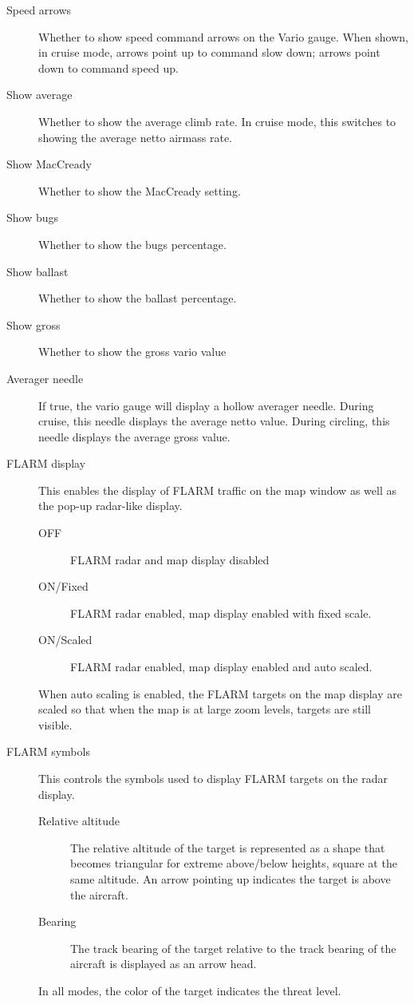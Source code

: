 \documentclass[a4paper,12pt]{refrep}
\begin{document}
\begin{description}
\item[Speed arrows] Whether to show speed command arrows on the Vario gauge.
When shown, in cruise mode, arrows point up to command slow down; arrows point down to command speed up.
\item[Show average]  Whether to show the average climb rate.  In cruise mode, this switches to showing the average netto airmass rate.
\item[Show MacCready] Whether to show the MacCready setting.
\item[Show bugs] Whether to show the bugs percentage.
\item[Show ballast] Whether to show the ballast percentage.
\item[Show gross] Whether to show the gross vario value
\item[Averager needle] If true, the vario gauge will display a hollow averager needle.  During cruise, this needle displays the average netto value.  During circling, this needle displays the average gross value.
\item[FLARM display]
This enables the display of FLARM traffic on the map window as well
as the pop-up radar-like display.
\begin{description}
\item[OFF] FLARM radar and map display disabled
\item[ON/Fixed] FLARM radar enabled, map display enabled with fixed scale.
\item[ON/Scaled] FLARM radar enabled, map display enabled and auto scaled.
\end{description}
When auto scaling is enabled, the FLARM targets on the map display are scaled so that when the map is at large zoom levels, targets are still visible.
\item[FLARM symbols]  This controls the symbols used to display FLARM targets on the radar display.
\begin{description}
\item[Relative altitude] The relative altitude of the target is represented as a shape that becomes triangular for extreme above/below heights, square at the same altitude.  An arrow pointing up indicates the target is above the aircraft.
\item[Bearing] The track bearing of the target relative to the track bearing of the aircraft is displayed as an arrow head.
\end{description}
In all modes, the color of the target indicates the threat level.

\end{description}
\end{document}

